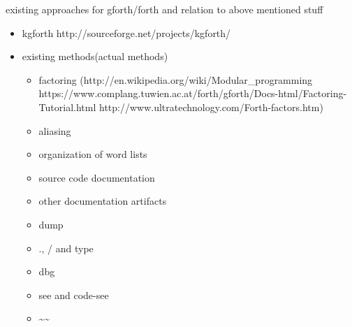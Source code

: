 existing approaches for gforth/forth and relation to above mentioned stuff

\begin{itemize}
\item kgforth http://sourceforge.net/projects/kgforth/
\item existing methods(actual methods)
	\begin{itemize}
	\item factoring (http://en.wikipedia.org/wiki/Modular\_programming https://www.complang.tuwien.ac.at/forth/gforth/Docs-html/Factoring-Tutorial.html http://www.ultratechnology.com/Forth-factors.htm)
	\item aliasing
	\item organization of word lists
	\item source code documentation
	\item other documentation artifacts
	\item dump
	\item ., / and type
	\item dbg
	\item see and code-see
	\item \textasciitilde\textasciitilde
	\end{itemize}
\end{itemize}